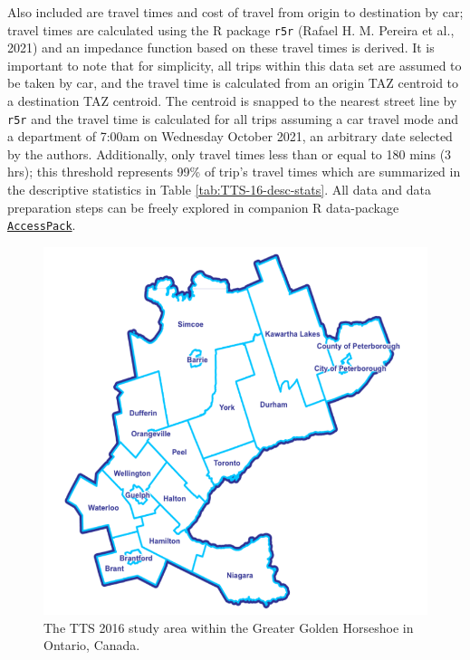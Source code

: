 \documentclass[]{elsarticle} %
\begin{document}
Also included are travel times and cost of travel from origin to
destination by car; travel times are calculated using the R package
\texttt{r5r} (Rafael H. M. Pereira et al., 2021) and an impedance
function based on these travel times is derived. It is important to note
that for simplicity, all trips within this data set are assumed to be
taken by car, and the travel time is calculated from an origin TAZ
centroid to a destination TAZ centroid. The centroid is snapped to the
nearest street line by \texttt{r5r} and the travel time is calculated
for all trips assuming a car travel mode and a department of 7:00am on
Wednesday October 2021, an arbitrary date selected by the authors.
Additionally, only travel times less than or equal to 180 mins (3 hrs);
this threshold represents 99\% of trip's travel times which are
summarized in the descriptive statistics in Table
\ref{tab:TTS-16-desc-stats}. All data and data preparation steps can be
freely explored in companion R data-package
\href{https://github.com/soukhova/AccessPack}{\texttt{AccessPack}}.

\begin{figure}

{\centering \includegraphics[width=0.7\linewidth]{images/Greater-Golden-Horseshoe-Map} 

}

\caption{\label{fig:TTS-16-survey-area}The TTS 2016 study area within the Greater Golden Horseshoe in Ontario, Canada.}\label{fig:TTS-16-survey-area}
\end{figure}
\end{document}

